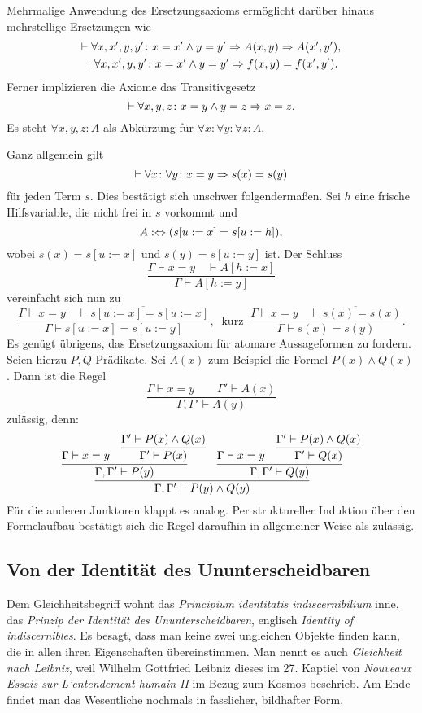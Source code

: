 Mehrmalige Anwendung des Ersetzungsaxioms ermöglicht darüber hinaus
mehrstellige Ersetzungen wie
\begin{gather*}
\vdash\forall x,x',y,y'\colon x=x'\land y=y'\Rightarrow A(x,y)\Rightarrow A(x',y'),\\
\vdash\forall x,x',y,y'\colon x=x'\land y=y'\Rightarrow f(x,y)=f(x',y').
\end{gather*}
Ferner implizieren die Axiome das Transitivgesetz
\[\vdash\forall x,y,z\colon x=y\land y=z\Rightarrow x=z.\]
Es steht $\forall x,y,z\colon A$ als Abkürzung für
$\forall x\colon\forall y\colon\forall z\colon A$.

Ganz allgemein gilt
\[\vdash\forall x\colon\forall y\colon x=y\Rightarrow s(x)=s(y)\]
für jeden Term $s$. Dies bestätigt sich unschwer folgendermaßen.
Sei $h$ eine frische Hilfsvariable, die nicht
frei in $s$ vorkommt und
\[A:\Leftrightarrow (s[u:=x]=s[u:=h]),\]
wobei $s(x)=s[u:=x]$ und $s(y)=s[u:=y]$ ist. Der Schluss
\[\dfrac{\Gamma\vdash x=y\quad\vdash A[h:=x]}{\Gamma\vdash A[h:=y]}\]
vereinfacht sich nun zu
\[\dfrac{\Gamma\vdash x=y\quad\overline{\vdash s[u:=x]=s[u:=x]}}{\Gamma\vdash s[u:=x]=s[u:=y]},
\;\;\text{kurz}\;\;\dfrac{\Gamma\vdash x=y\quad\overline{\vdash s(x)=s(x)}}{\Gamma\vdash s(x)=s(y)}.\]
Es genügt übrigens, das Ersetzungsaxiom für atomare Aussageformen zu fordern.
Seien hierzu $P,Q$ Prädikate. Sei $A(x)$ zum Beispiel die Formel $P(x)\land Q(x)$.
Dann ist die Regel
\[\dfrac{\Gamma\vdash x=y\qquad \Gamma'\vdash A(x)}{\Gamma,\Gamma'\vdash A(y)}\]
zulässig, denn:
\[
\infer{\Gamma,\Gamma'\vdash P(y)\land Q(y)}{
  \infer{\Gamma,\Gamma'\vdash P(y)}{
    \Gamma\vdash x=y
  & \infer{\Gamma'\vdash P(x)}{
      \Gamma'\vdash P(x)\land Q(x)}}
& \infer{\Gamma,\Gamma'\vdash Q(y)}{
    \Gamma\vdash x=y
  & \infer{\Gamma'\vdash Q(x)}{
      \Gamma'\vdash P(x)\land Q(x)}}}
\]
Für die anderen Junktoren klappt es analog. Per struktureller Induktion
über den Formelaufbau bestätigt sich die Regel daraufhin in allgemeiner
Weise als zulässig.

\subsection{Von der Identität des Ununterscheidbaren}

Dem Gleichheitsbegriff wohnt das \emph{Principium
identitatis indiscernibilium} inne, das \emph{Prinzip der Identität des
Ununterscheidbaren}, englisch \emph{Identity of indiscernibles}.
Es besagt, dass man keine zwei ungleichen Objekte finden kann,
die in allen ihren Eigenschaften übereinstimmen. Man nennt es auch
\emph{Gleichheit nach Leibniz}, weil Wilhelm Gottfried
Leibniz dieses im 27. Kaptiel von
\emph{Nouveaux Essais sur L'entendement humain II}
im Bezug zum Kosmos beschrieb. Am Ende findet man das Wesentliche
nochmals in fasslicher, bildhafter Form,

